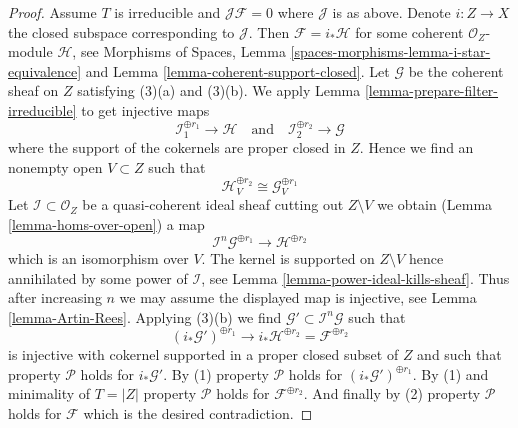 \documentclass[10pt,a4paper]{amsart}
\theoremstyle{plain}
\theoremstyle{definition}
\theoremstyle{remark}
\numberwithin{equation}{subsection}
\begin{document}
\begin{proof}
\medskip\noindent
Assume $T$ is irreducible and $\mathcal{J}\mathcal{F} = 0$ where
$\mathcal{J}$ is as above. Denote $i : Z \to X$ the closed subspace
corresponding to $\mathcal{J}$. Then $\mathcal{F} = i_*\mathcal{H}$
for some coherent $\mathcal{O}_Z$-module $\mathcal{H}$, see
Morphisms of Spaces, Lemma \ref{spaces-morphisms-lemma-i-star-equivalence}
and Lemma \ref{lemma-coherent-support-closed}.
Let $\mathcal{G}$ be the coherent sheaf on $Z$ satisfying
(3)(a) and (3)(b). We apply Lemma \ref{lemma-prepare-filter-irreducible}
to get injective maps
$$
\mathcal{I}_1^{\oplus r_1} \to \mathcal{H}
\quad\text{and}\quad
\mathcal{I}_2^{\oplus r_2} \to \mathcal{G}
$$
where the support of the cokernels are proper closed in $Z$. Hence we find
an nonempty open $V \subset Z$ such that
$$
\mathcal{H}^{\oplus r_2}_V \cong \mathcal{G}^{\oplus r_1}_V
$$
Let $\mathcal{I} \subset \mathcal{O}_Z$ be a quasi-coherent ideal sheaf
cutting out $Z \setminus V$ we obtain
(Lemma \ref{lemma-homs-over-open})
a map
$$
\mathcal{I}^n\mathcal{G}^{\oplus r_1} \longrightarrow \mathcal{H}^{\oplus r_2}
$$
which is an isomorphism over $V$. The kernel is supported on $Z \setminus V$
hence annihilated by some power of $\mathcal{I}$, see
Lemma \ref{lemma-power-ideal-kills-sheaf}. Thus after increasing
$n$ we may assume the displayed map is injective, see
Lemma \ref{lemma-Artin-Rees}. Applying (3)(b) we find
$\mathcal{G}' \subset \mathcal{I}^n\mathcal{G}$ such that
$$
(i_*\mathcal{G}')^{\oplus r_1} \longrightarrow
i_*\mathcal{H}^{\oplus r_2} = \mathcal{F}^{\oplus r_2}
$$
is injective with cokernel supported in a proper closed subset of $Z$
and such that property $\mathcal{P}$ holds for $i_*\mathcal{G}'$.
By (1) property $\mathcal{P}$ holds for $(i_*\mathcal{G}')^{\oplus r_1}$.
By (1) and minimality of $T = |Z|$ property $\mathcal{P}$ holds for
$\mathcal{F}^{\oplus r_2}$. And finally by (2) property $\mathcal{P}$
holds for $\mathcal{F}$ which is the desired contradiction.
\end{proof}
\end{document}
